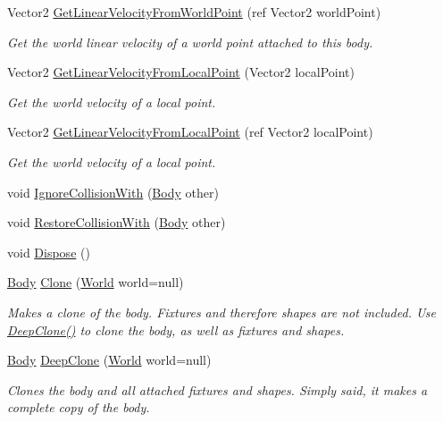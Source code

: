 \begin{DoxyCompactItemize}
Vector2 \hyperlink{class_farseer_physics_1_1_dynamics_1_1_body_a820aec7efc8bfcb3e7612e8829067007}{Get\+Linear\+Velocity\+From\+World\+Point} (ref Vector2 world\+Point)
\begin{DoxyCompactList}\small\item\em Get the world linear velocity of a world point attached to this body. \end{DoxyCompactList}\item 
Vector2 \hyperlink{class_farseer_physics_1_1_dynamics_1_1_body_a390adf9391e4861245403613a9086958}{Get\+Linear\+Velocity\+From\+Local\+Point} (Vector2 local\+Point)
\begin{DoxyCompactList}\small\item\em Get the world velocity of a local point. \end{DoxyCompactList}\item 
Vector2 \hyperlink{class_farseer_physics_1_1_dynamics_1_1_body_a71f5e27bcb7287c25480ebce4345a203}{Get\+Linear\+Velocity\+From\+Local\+Point} (ref Vector2 local\+Point)
\begin{DoxyCompactList}\small\item\em Get the world velocity of a local point. \end{DoxyCompactList}\item 
void \hyperlink{class_farseer_physics_1_1_dynamics_1_1_body_aa9eff4489a8f0c127a973a940f1f9ac0}{Ignore\+Collision\+With} (\hyperlink{class_farseer_physics_1_1_dynamics_1_1_body}{Body} other)
\item 
void \hyperlink{class_farseer_physics_1_1_dynamics_1_1_body_a492cd4b6443acc3ef17d26ca9f3e13e8}{Restore\+Collision\+With} (\hyperlink{class_farseer_physics_1_1_dynamics_1_1_body}{Body} other)
\item 
void \hyperlink{class_farseer_physics_1_1_dynamics_1_1_body_aefa0274ac90eaa5731df4f53499ef418}{Dispose} ()
\item 
\hyperlink{class_farseer_physics_1_1_dynamics_1_1_body}{Body} \hyperlink{class_farseer_physics_1_1_dynamics_1_1_body_a20b0039f23574f6f1146d93f47a4b3a7}{Clone} (\hyperlink{class_farseer_physics_1_1_dynamics_1_1_world}{World} world=null)
\begin{DoxyCompactList}\small\item\em Makes a clone of the body. Fixtures and therefore shapes are not included. Use \hyperlink{class_farseer_physics_1_1_dynamics_1_1_body_a51d27c2c15f24d93020de38c25a11286}{Deep\+Clone()} to clone the body, as well as fixtures and shapes. \end{DoxyCompactList}\item 
\hyperlink{class_farseer_physics_1_1_dynamics_1_1_body}{Body} \hyperlink{class_farseer_physics_1_1_dynamics_1_1_body_a51d27c2c15f24d93020de38c25a11286}{Deep\+Clone} (\hyperlink{class_farseer_physics_1_1_dynamics_1_1_world}{World} world=null)
\begin{DoxyCompactList}\small\item\em Clones the body and all attached fixtures and shapes. Simply said, it makes a complete copy of the body. \end{DoxyCompactList}\end{DoxyCompactItemize}
